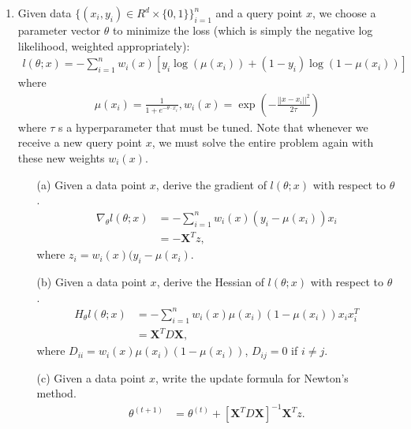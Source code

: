 \documentclass[10pt]{article}
\begin{document}
\begin{enumerate}[1.]
    \item  Given data $\{(x_i, y_i) \in R^d \times \{0, 1\}\}_{i=1}^n$ and a query point $x$, we choose a parameter vector $\theta$ to minimize the loss (which is simply the
          negative log likelihood, weighted appropriately):
          \begin{align*}
              l(\theta;x) = -\sum_{i=1}^{n}w_i(x)[y_i\log(\mu(x_i))+(1-y_i)\log(1-\mu(x_i))]
          \end{align*}
          where
          \begin{align*}
              \mu(x_i) = \frac{1}{1+e^{-\theta\cdot x_i}}, w_i(x) = \exp(-\frac{||x-x_i||^2}{2\tau})
          \end{align*}
          where $\tau$ s a hyperparameter that must be tuned. Note that whenever we receive a new query point $x$, we must solve
          the entire problem again with these new weights $w_i(x)$.

          \begin{itemize}
              \item[(a)] Given a data point $x$,  derive the gradient of $l(\theta; x)$ with respect to $\theta$.~
                    {\color{blue}
                        \begin{align*}
                            \nabla_\theta l(\theta;x) & =-\sum_{i=1}^{n}w_i(x)(y_i-\mu(x_i))x_i \\
                                                      & =-\textbf{X}^Tz,
                        \end{align*}
                        where $z_i = w_i(x)(y_i-\mu(x_i)$.
                    }
              \item[(b)] Given a data point $x$,  derive the Hessian of $l(\theta; x)$ with respect to $\theta$.~
                    {\color{blue}
                        \begin{align*}
                            H_\theta l(\theta;x) & =-\sum_{i=1}^{n}w_i(x)\mu(x_i)(1-\mu(x_i))x_ix_i^T \\
                                                 & =\textbf{X}^TD\textbf{X},
                        \end{align*}
                        where $D_{ii} = w_i(x)\mu(x_i)(1-\mu(x_i))$, $D_{ij} = 0$ if $i\neq j$.
                    }
              \item[(c)]  Given a data point $x$, write the update formula for Newton’s method.~
                    {\color{blue}
                        \begin{align*}
                            \theta^{(t+1)} & = \theta^{(t)}+[\textbf{X}^TD\textbf{X}]^{-1}\textbf{X}^Tz. \\
                        \end{align*}}
          \end{itemize}




\end{enumerate}
\end{document}

